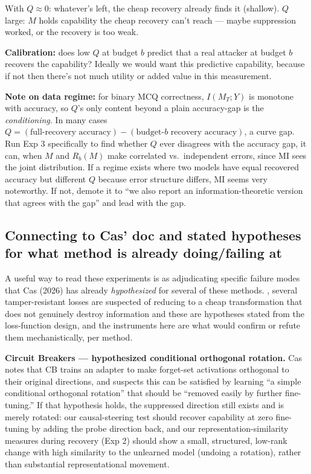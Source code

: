 \documentclass[11pt]{article}
\begin{document}
With $Q \approx 0$: whatever's left, the cheap recovery already finds it
(shallow). $Q$ large: $M$ holds capability the cheap recovery can't reach ---
maybe suppression worked, or the recovery is too weak.

\textbf{Calibration:} does low $Q$ at budget $b$ predict that a real attacker at
budget $b$ recovers the capability? Ideally we would want this predictive
capability, because if not then there's not much utility or added value in this
measurement.

\textbf{Note on data regime:} for binary MCQ correctness, $I(M_T; Y)$ is
monotone with accuracy, so $Q$'s only content beyond a plain accuracy-gap is the
\emph{conditioning}. In many cases $Q = (\text{full-recovery accuracy}) -
(\text{budget-}b\text{ recovery accuracy})$, a curve gap. Run Exp 3 specifically
to find whether $Q$ ever disagrees with the accuracy gap, it can, when $M$
and $R_b(M)$ make correlated vs.\ independent errors, since MI sees the joint
distribution. If a regime exists where two models have equal recovered accuracy
but different $Q$ because error structure differs, MI seems very noteworthy. If
not, demote it to ``we also report an information-theoretic version that agrees
with the gap'' and lead with the gap.

\subsection*{Connecting to Cas'  doc and stated hypotheses for what method is already doing/failing at }

A useful way to read these experiments is as adjudicating specific failure modes
that Cas (2026) has already \emph{hypothesized} for several of these methods.
, several tamper-resistant losses are suspected of reducing
to a cheap transformation that does not genuinely destroy information and these
are hypotheses stated from the loss-function design, and the instruments here
are what would confirm or refute them mechanistically, per method.

\textbf{Circuit Breakers --- hypothesized conditional orthogonal rotation.}
Cas notes that CB trains an adapter to make forget-set activations orthogonal
to their original directions, and suspects this can be satisfied by learning
``a simple conditional orthogonal rotation'' that should be ``removed easily by
further fine-tuning.'' If that hypothesis holds, the suppressed direction still
exists and is merely rotated: our causal-steering test should recover capability
at zero fine-tuning by adding the probe direction back, and our
representation-similarity measures during recovery (Exp 2) should show a small,
structured, low-rank change with high similarity to the unlearned model
(undoing a rotation), rather than substantial representational movement.
\end{document}
